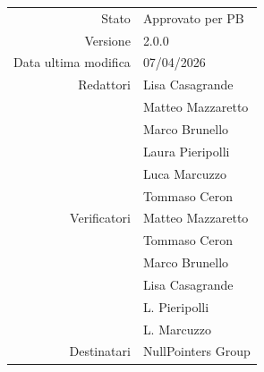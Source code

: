 \begin{center}
\begin{tabular}{r|l}
    Stato & Approvato per PB \\[0.5em]
    Versione & 2.0.0 \\[0.5em]
    Data ultima modifica & 07/04/2026 \\[0.5em]
    Redattori & Lisa Casagrande \\
              & Matteo Mazzaretto \\
              & Marco Brunello \\
              & Laura Pieripolli \\
              & Luca Marcuzzo \\
              & Tommaso Ceron \\ [0.5em]
    Verificatori & Matteo Mazzaretto \\
                 & Tommaso Ceron \\
                 & Marco Brunello \\
                 & Lisa Casagrande  \\
                 & L. Pieripolli \\
                 & L. Marcuzzo \\ [0.5em]
    Destinatari & NullPointers Group \\
\end{tabular}
\end{center}
